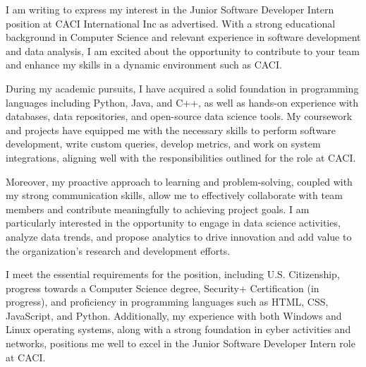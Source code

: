 \documentclass[]{cover}
\begin{document}

\hfill

\begin{minipage}[t]{0.5\textwidth}
\end{minipage}

\begin{minipage}[t]{0.49\textwidth}
\currentdate{\today}
\end{minipage}


I am writing to express my interest in the Junior Software Developer Intern position at CACI International Inc as advertised. With a strong educational background in Computer Science and relevant experience in software development and data analysis, I am excited about the opportunity to contribute to your team and enhance my skills in a dynamic environment such as CACI.

During my academic pursuits, I have acquired a solid foundation in programming languages including Python, Java, and C++, as well as hands-on experience with databases, data repositories, and open-source data science tools. My coursework and projects have equipped me with the necessary skills to perform software development, write custom queries, develop metrics, and work on system integrations, aligning well with the responsibilities outlined for the role at CACI.

Moreover, my proactive approach to learning and problem-solving, coupled with my strong communication skills, allow me to effectively collaborate with team members and contribute meaningfully to achieving project goals. I am particularly interested in the opportunity to engage in data science activities, analyze data trends, and propose analytics to drive innovation and add value to the organization's research and development efforts.


I meet the essential requirements for the position, including U.S. Citizenship, progress towards a Computer Science degree, Security+ Certification (in progress), and proficiency in programming languages such as HTML, CSS, JavaScript, and Python. Additionally, my experience with both Windows and Linux operating systems, along with a strong foundation in cyber activities and networks, positions me well to excel in the Junior Software Developer Intern role at CACI.
\end{document}
